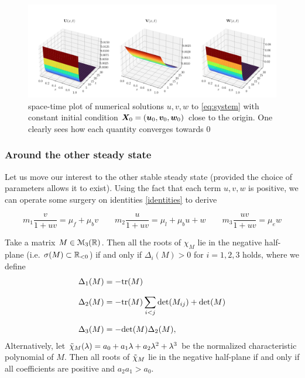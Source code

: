 \begin{figure}
	\centering
	\includegraphics[width=\textwidth]{figures/stable_origin.png}
	\caption{space-time plot of numerical solutions $u, v, w$ to \ref{eq:system} with constant initial condition $\bm X_0 = (\bm{u}_0, \bm{v}_0, \bm{w}_0)$ close to the origin. One clearly sees how each quantity converges towards 0}
	\label{fig:simulations}
\end{figure}

\subsubsection{Around the other steady state}

Let us move our interest to the other stable steady state (provided the choice of parameters allows it to exist). Using the fact that each term $u, v, w$ is positive, we can operate some surgery on identities \ref{identities} to derive

\begin{equation}
	\label{new_identities}
		m_1 \dfrac{v}{1 + u v} = \mu_f +  \mu_b v \quad \quad
		m_2 \dfrac{u}{1 + u v}  = \mu_l +  \mu_b u + w \quad \quad
		m_3 \dfrac{ u v}{1 + uv} = \mu_e w
\end{equation}


\begin{theorem}
	Take a matrix $M \in \EuScript{M}_3(\mathbb{R})$. Then all the roots of $\chi_M$ lie in the negative half-plane (i.e. $\sigma(M) \subset \mathbb{R}_{<0}$) if and only if
	$\Delta_i(M) > 0$ for $i=1, 2, 3$ holds, where we define
	\begin{align*}
		\Delta_1(M) &= -\mathrm{tr}(M) \\[0.7em]
		\Delta_2(M) &= -\mathrm{tr}(M) \sum_{i < j} \mathrm{det}(M_{ij}) + \mathrm{det}(M) \\[0.7em]
		\Delta_3(M) &= -\mathrm{det}(M) \Delta_2(M),
	\end{align*}
Alternatively, let $\Tilde{\chi}_{M}(\lambda) = a_0 + a_1 \lambda + a_2 \lambda^2 + \lambda^3$ be the normalized characteristic polynomial of $M$. Then all roots of $\Tilde{\chi}_M$ lie in the negative half-plane if and only if all coefficients are positive and $a_2 a_1 > a_0$.
\end{theorem}


